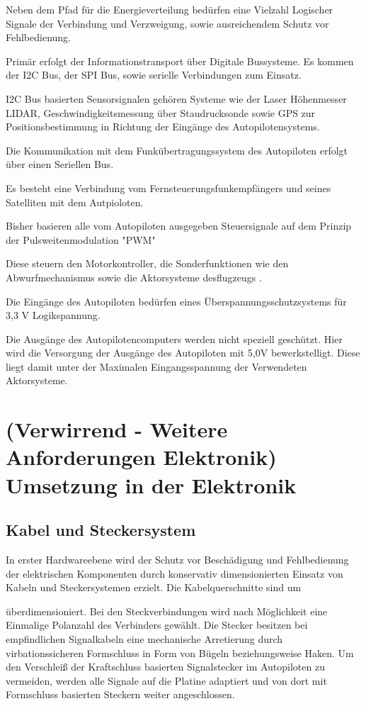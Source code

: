 Neben dem Pfad für die Energieverteilung bedürfen eine Vielzahl Logischer Signale der Verbindung und Verzweigung, sowie ausreichendem Schutz vor Fehlbedienung.

Primär erfolgt der Informationstransport über Digitale Bussysteme. Es kommen der I2C Bus, der SPI Bus, sowie serielle Verbindungen zum Einsatz.

I2C  Bus basierten Sensorsignalen gehören Systeme wie der Laser Höhenmesser LIDAR, Geschwindigkeitsmessung über Staudrucksonde sowie GPS zur Positionsbestimmung in Richtung der Eingänge des Autopilotensystems.

Die Kommunikation mit dem Funkübertragungssystem des Autopiloten erfolgt über einen Seriellen Bus.

Es besteht eine Verbindung vom Fernsteuerungsfunkempfängers und seines Satelliten mit dem Autpioloten.

Bisher basieren alle vom Autopiloten ausgegeben Steuersignale auf dem Prinzip der Pulsweitenmodulation "PWM"

Diese steuern den Motorkontroller, die Sonderfunktionen wie den Abwurfmechanismus sowie die Aktorsysteme desflugzeugs .


Die Eingänge des Autopiloten bedürfen eines Überspannungsschutzsystems für 3,3 V Logikspannung.

Die Ausgänge des Autopilotencomputers werden nicht speziell geschützt. Hier wird die Versorgung der Ausgänge des Autopiloten mit 5,0V bewerkstelligt. Diese liegt damit unter der  Maximalen Eingangsspannung der Verwendeten Aktorsysteme.


\section{(Verwirrend - Weitere Anforderungen Elektronik) Umsetzung in der Elektronik}

\subsection{Kabel und Steckersystem}

In erster Hardwareebene  wird der Schutz vor Beschädigung und Fehlbedienung der elektrischen Komponenten durch konservativ dimensionierten Einsatz von Kabeln und Steckersystemen erzielt. Die Kabelquerschnitte sind um
\begin{comment} Prozentzahl ?\end{comment}
überdimensioniert. Bei den Steckverbindungen wird nach Möglichkeit eine Einmalige Polanzahl des Verbinders gewählt.
Die Stecker besitzen bei empfindlichen Signalkabeln eine mechanische Arretierung durch virbationssicheren Formschluss in Form von Bügeln beziehungsweise Haken.
Um den Verschleiß der Kraftschluss basierten Signalstecker im Autopiloten zu vermeiden, werden alle Signale auf die Platine adaptiert und von dort mit Formschluss basierten Steckern weiter angeschlossen.

